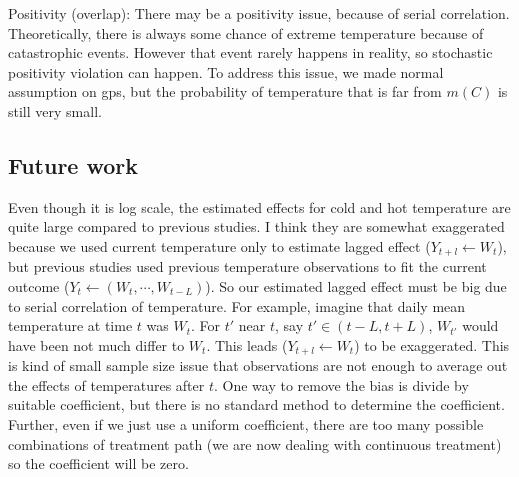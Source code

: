 \documentclass[12pt]{article}
\begin{document}
Positivity (overlap):
There may be a positivity issue, because of serial correlation.
Theoretically, there is always some chance of extreme temperature because of catastrophic events.
However that event rarely happens in reality, 
so stochastic positivity violation\cite{zivich2022} can happen.
To address this issue, we made normal assumption on gps,
but the probability of temperature that is far from $m(C)$ is still very small.



\subsection{Future work}

Even though it is log scale, 
the estimated effects for cold and hot temperature are quite large compared to previous studies.
I think they are somewhat exaggerated
because we used current temperature only to estimate lagged effect ($Y_{t+l} \leftarrow W_t$),
but previous studies used previous temperature observations 
to fit the current outcome ($Y_t \leftarrow (W_t, \cdots, W_{t-L})$).
So our estimated lagged effect must be big due to serial correlation of temperature.
For example, imagine that daily mean temperature at time $t$ was $W_t$.
For $t'$ near $t$, say $t' \in (t-L, t+L)$, $W_{t'}$ would have been not much differ to $W_t$.
This leads ($Y_{t+l} \leftarrow W_t$) to be exaggerated.
This is kind of small sample size issue that observations are not enough
to average out the effects of temperatures after $t$.
One way to remove the bias is divide by suitable coefficient\cite{bojinov2019},
but there is no standard method to determine the coefficient.
Further, even if we just use a uniform coefficient,
there are too many possible combinations of treatment path (we are now dealing with continuous treatment)
so the coefficient will be zero.
{}

\end{document}
